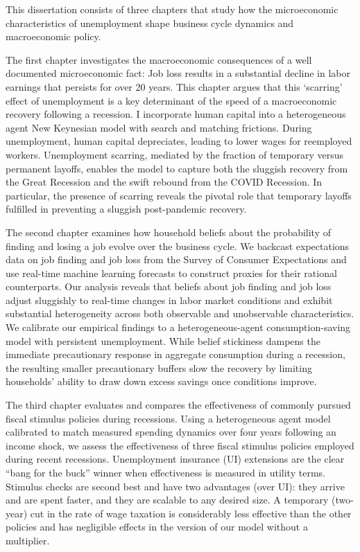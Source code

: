%

This dissertation consists of three chapters that study how the microeconomic characteristics of unemployment shape business cycle dynamics and macroeconomic policy.

The first chapter investigates the macroeconomic consequences of a well documented microeconomic fact: Job loss results in a substantial decline in labor earnings that persists for over 20 years. This chapter argues that this `scarring' effect of unemployment is a key determinant of the speed of a macroeconomic recovery following a recession. I incorporate human capital into a heterogeneous agent New Keynesian model with search and matching frictions. During unemployment, human capital depreciates, leading to lower wages for reemployed workers. Unemployment scarring, mediated by the fraction of temporary versus permanent layoffs, enables the model to capture both the sluggish recovery from the Great Recession and the swift rebound from the COVID Recession. In particular, the presence of scarring reveals the pivotal role that temporary layoffs fulfilled in preventing a sluggish post-pandemic recovery. %

The second chapter examines how household beliefs about the probability of finding and losing a job evolve over the business cycle. We backcast expectations data on job finding and job loss from the Survey of Consumer Expectations and use real-time machine learning forecasts to construct proxies for their rational counterparts. Our analysis reveals that beliefs about job finding and job loss adjust sluggishly to real-time changes in labor market conditions and exhibit substantial heterogeneity across both observable and unobservable characteristics. We calibrate our empirical findings to a heterogeneous-agent consumption-saving model with persistent unemployment. While belief stickiness dampens the immediate precautionary response in aggregate consumption during a recession, the resulting smaller precautionary buffers slow the recovery by limiting households’ ability to draw down excess savings once conditions improve.



The third chapter evaluates and compares the effectiveness of commonly pursued fiscal stimulus policies during recessions. Using a heterogeneous agent model calibrated to match measured spending dynamics over four years following an income shock, we assess the effectiveness of three fiscal stimulus policies employed during recent recessions. Unemployment insurance (UI) extensions are the clear “bang for the buck” winner when effectiveness is measured in utility terms. Stimulus checks are second best and have two advantages (over UI): they arrive and are spent faster, and they are scalable to any desired size. A temporary (two-year) cut in the rate of wage taxation is considerably less effective than the other policies and has negligible effects in the version of our model without a multiplier.


